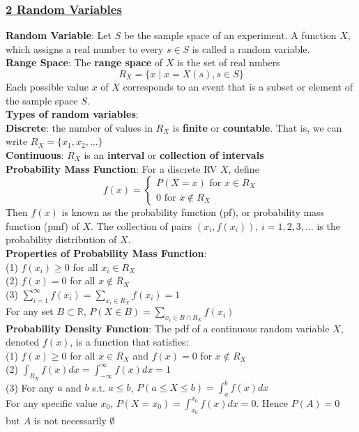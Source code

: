 \documentclass{article}
\begin{document}
\begin{multicols*}{2}
\subsubsection*{\underline{2 Random Variables}}
\textbf{Random Variable}: Let $S$ be the sample space of an experiment. A function $X$, which assigns a real number to every $s \in S$ is called a random variable. \\
\textbf{Range Space}: The \textbf{range space} of $X$ is the set of real nmbers $$R_X=\{x\;|\;x=X(s), s\in S\}$$ Each possible value $x$ of $X$ corresponds to an event that is a subset or element of the sample space $S$. \\
\textbf{Types of random variables}: \\ \textbf{Discrete}: the number of values in $R_X$ is \textbf{finite} or \textbf{countable}. That is, we can write $R_X=\{x_1,x_2,\dots\}$\\
\textbf{Continuous}: $R_X$ is an \textbf{interval} or \textbf{collection of intervals} \\
\textbf{Probability Mass Function}: For a discrete RV $X$, define $$f(x)=\begin{cases}
    P(X=x) \text{ for } x\in R_X \\
    0 \text{ for } x\not\in R_X 
\end{cases}$$
Then $f(x)$ is known as the probability function (pf), or probability mass function (pmf) of $X$. The collection of pairs $(x_i, f(x_i))$, $i=1,2,3,\dots$ is the probability distribution of $X$. \\
\textbf{Properties of Probability Mass Function}: \\
(1) $f(x_i)\geq0$ for all $x_i \in R_X$ \\
(2) $f(x)=0$ for all $x\not\in R_X$ \\
(3) $\sum_{i=1}^\infty f(x_i)=\sum_{x_i\in R_X}f(x_i)=1$ \\
For any set $B\subset \mathbb{R}$, $P(X\in B)=\sum_{x_i\in B\cap R_X} f(x_i)$\\
\textbf{Probability Density Function}: The pdf of a continuous random variable $X$, denoted $f(x)$, is a function that satisfies: \\
(1) $f(x)\geq 0$ for all $x\in R_X$ and $f(x)=0$ for $x\not\in R_X$ \\
(2) $\int_{R_X}f(x)dx=\int^\infty_{-\infty}f(x)dx=1$ \\
(3) For any $a$ and $b$ s.t. $a\leq b$, $P(a\leq X\leq b)=\int^b_af(x)dx$ \\
For any specific value $x_0$, $P(X=x_0)=\int^{x_0}_{x_0}f(x)dx=0$. Hence $P(A)=0$ but $A$ is not necessarily $\emptyset$ \\

\end{multicols*}
\end{document}
